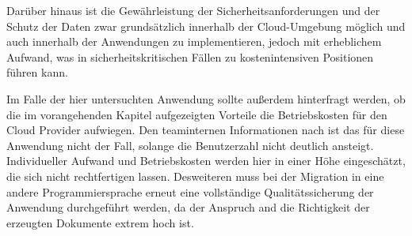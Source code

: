 Darüber hinaus ist die Gewährleistung der Sicherheitsanforderungen und der Schutz der Daten zwar grundsätzlich innerhalb der Cloud-Umgebung möglich und auch innerhalb der Anwendungen zu implementieren, jedoch mit erheblichem Aufwand, was in sicherheitskritischen Fällen zu kostenintensiven Positionen führen kann. 

Im Falle der hier untersuchten Anwendung sollte außerdem hinterfragt werden, ob die im vorangehenden Kapitel aufgezeigten Vorteile die Betriebskosten für den Cloud Provider aufwiegen. Den teaminternen Informationen nach ist das für diese Anwendung nicht der Fall, solange die Benutzerzahl nicht deutlich ansteigt. Individueller Aufwand und Betriebskosten werden hier in einer Höhe eingeschätzt, die sich nicht rechtfertigen lassen. Desweiteren muss bei der Migration in eine andere Programmiersprache erneut eine vollständige Qualitätssicherung der Anwendung durchgeführt werden, da der Anspruch and die Richtigkeit der erzeugten Dokumente extrem hoch ist.
\pagebreak